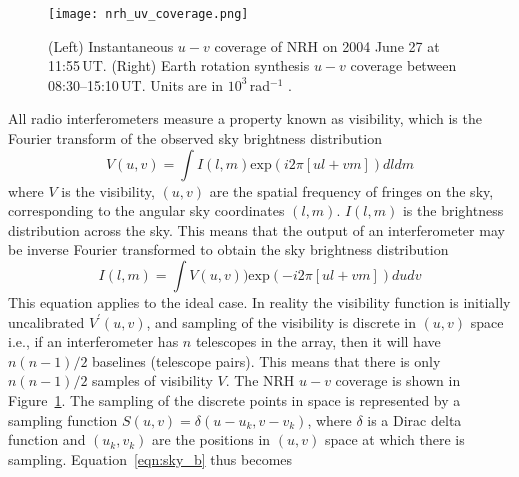\begin{figure}
	\begin{center}
		\texttt{[image: nrh\_uv\_coverage.png]}
		\caption{(Left) Instantaneous $u-v$ coverage of NRH on 2004 June 27 at 11:55\,UT. (Right) Earth rotation synthesis $u-v$ 		  coverage between 08:30--15:10\,UT. Units are in $10^3$\,rad$^{-1}$ \citep{mercier2009}.}
	\label{fig:nrh_uv}
	\end{center}
\end{figure}
All radio interferometers measure a property known as visibility, which is the Fourier transform of the observed sky brightness distribution
\begin{equation}
V(u,v)=\int I(l,m)\mathrm{exp}(i2\pi[ul +vm])dldm
\end{equation}
where $V$ is the visibility, $(u,v)$ are the spatial frequency of fringes on the sky, corresponding to the angular sky coordinates $(l,m)$. $I(l,m)$ is the brightness distribution across the sky. This means that the output of an interferometer may be inverse Fourier transformed to obtain the sky brightness distribution
\begin{equation}
I(l,m)=\int V(u,v))\mathrm{exp}(-i2\pi[ul +vm])dudv
\label{eqn:sky_b}
\end{equation}
This equation applies to the ideal case. In reality the visibility function is initially uncalibrated $V^{'}(u,v)$, and sampling of the visibility is discrete in $(u,v)$ space i.e., if an interferometer has $n$ telescopes in the array, then it will have $n(n-1)/2$ baselines (telescope pairs). This means that there is only $n(n-1)/2$ samples of visibility $V$. The NRH $u-v$ coverage is shown in Figure~\ref{fig:nrh_uv}. The sampling of the discrete points in space is represented by a sampling function $S(u,v) = \delta(u-u_k, v-v_k)$, where $\delta$ is a Dirac delta function and $(u_k, v_k)$ are the positions in $(u, v)$ space at which there is sampling. Equation~\ref{eqn:sky_b} thus becomes
